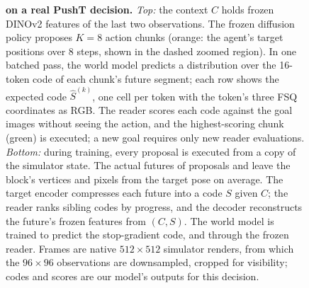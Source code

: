 \begin{figure}[t]
\caption{\textbf{\method on a real PushT decision.}
\emph{Top:} the context $C$ holds frozen DINOv2 features of the last two observations.
The frozen diffusion policy proposes $K{=}8$ action chunks (orange: the agent's target positions over 8 steps, shown in the dashed zoomed region).
In one batched pass, the world model predicts a distribution over the 16-token code of each chunk's future segment; each row shows the expected code $\hat S^{(k)}$, one cell per token with the token's three FSQ coordinates as RGB.
The reader scores each code against the goal images without seeing the action, and the highest-scoring chunk (green) is executed; a new goal requires only new reader evaluations.
\emph{Bottom:} during training, every proposal is executed from a copy of the simulator state.
The actual futures of proposals \FigBest{} and \FigWorst{} leave the block's vertices \FigErrBest{} and \FigErrWorst{} pixels from the target pose on average.
The target encoder compresses each future into a code $S$ given $C$; the reader ranks sibling codes by progress, and the decoder reconstructs the future's frozen features from $(C,S)$.
The world model is trained to predict the stop-gradient code, and through the frozen reader.
Frames are native $512{\times}512$ simulator renders, from which the $96{\times}96$ observations are downsampled, cropped for visibility; codes and scores are our model's outputs for this decision.}
\label{fig:overview}
\end{figure}
